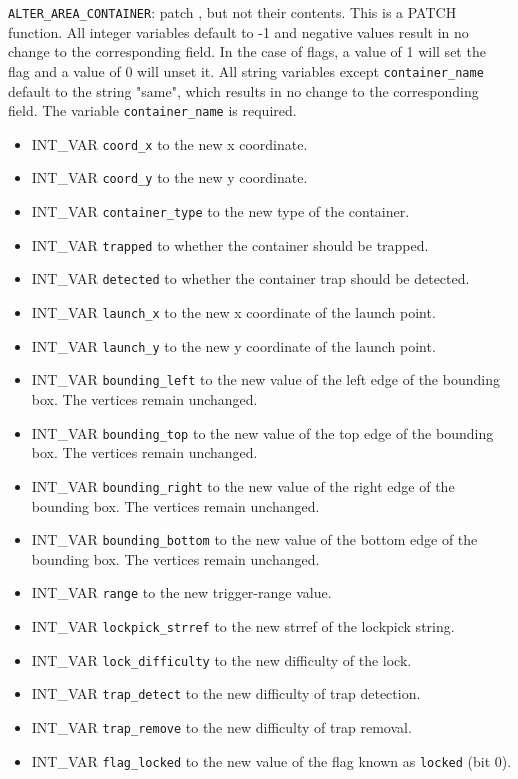 \documentclass{article}
\def\t#1{{\tt #1}}
\begin{document}
\verb+ALTER_AREA_CONTAINER+: patch , but not their contents. This is a PATCH function. All integer variables default to -1 and negative values result in no change to the corresponding field. In the case of flags, a value of 1 will set the flag and a value of 0 will unset it. All string variables except \verb+container_name+ default to the string "same", which results in no change to the corresponding field. The variable \verb+container_name+ is required.
\begin{itemize}
\item INT_VAR \verb+coord_x+ to the new x coordinate.
\item INT_VAR \verb+coord_y+ to the new y coordinate.
\item INT_VAR \verb+container_type+ to the new type of the container.
\item INT_VAR \verb+trapped+ to whether the container should be trapped.
\item INT_VAR \verb+detected+ to whether the container trap should be detected.
\item INT_VAR \verb+launch_x+ to the new x coordinate of the launch point.
\item INT_VAR \verb+launch_y+ to the new y coordinate of the launch point.
\item INT_VAR \verb+bounding_left+ to the new value of the left edge of the bounding box. The vertices remain unchanged.
\item INT_VAR \verb+bounding_top+ to the new value of the top edge of the bounding box. The vertices remain unchanged.
\item INT_VAR \verb+bounding_right+ to the new value of the right edge of the bounding box. The vertices remain unchanged.
\item INT_VAR \verb+bounding_bottom+ to the new value of the bottom edge of the bounding box. The vertices remain unchanged.
\item INT_VAR \verb+range+ to the new trigger-range value.
\item INT_VAR \verb+lockpick_strref+ to the new strref of the lockpick string.
\item INT_VAR \verb+lock_difficulty+ to the new difficulty of the lock.
\item INT_VAR \verb+trap_detect+ to the new difficulty of trap detection.
\item INT_VAR \verb+trap_remove+ to the new difficulty of trap removal.
\item INT_VAR \verb+flag_locked+ to the new value of the flag known as \t{locked} (bit 0).

\end{itemize}
\end{document}
